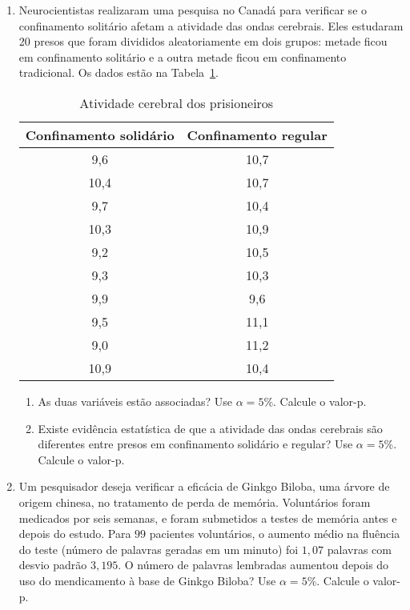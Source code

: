 \documentclass[8pt, a4paper]{article}
\begin{document}
\begin{enumerate}
	\item Neurocientistas realizaram uma pesquisa no Canadá para verificar se o confinamento solitário afetam a atividade das ondas cerebrais. Eles estudaram 20 presos que foram divididos aleatoriamente em dois grupos: metade ficou em confinamento solitário e a outra metade ficou em confinamento tradicional. Os dados estão na Tabela~\ref{tab:confinamento}.
	\begin{table}[ht]
		\centering
		\begin{tabular}{cc}
			\toprule[0.05cm]
			Confinamento solidário & Confinamento regular \\ 
			\midrule[0.025cm]
			9,6 & 10,7 \\ 
			10,4 & 10,7 \\ 
			9,7 & 10,4 \\ 
			10,3 & 10,9 \\ 
			9,2 & 10,5 \\ 
			9,3 & 10,3 \\ 
			9,9 & 9,6 \\ 
			9,5 & 11,1 \\ 
			9,0 & 11,2 \\ 
			10,9 & 10,4 \\ 
			\bottomrule[0.05cm]
		\end{tabular}
		\caption{Atividade cerebral dos prisioneiros} 
		\label{tab:confinamento}
	\end{table}
	\begin{enumerate}
		\item As duas variáveis estão associadas? Use $\alpha = 5\%$. Calcule o valor-p.
		\item Existe evidência estatística de que a atividade das ondas cerebrais são diferentes entre presos em confinamento solidário e regular? Use $\alpha = 5\%$. Calcule o valor-p. 
	\end{enumerate}
	
	\item Um pesquisador deseja verificar a eficácia de Ginkgo Biloba, uma árvore de origem chinesa, no tratamento de perda de memória. Voluntários foram medicados por seis semanas, e foram submetidos a testes de memória antes e depois do estudo. Para $99$ pacientes voluntários, o aumento médio na fluência do teste (número de palavras geradas em um minuto) foi $1,07$ palavras com desvio padrão $3,195$. O número de palavras lembradas aumentou depois do uso do mendicamento à base de Ginkgo Biloba? Use $\alpha = 5\%$. Calcule o valor-p.
	

\end{enumerate}
\end{document}

